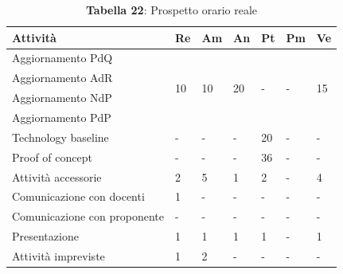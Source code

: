 \begin{table}[H]
	\centering
	\begin{tabular}{|l|l|l|l|l|l|l|}
		\hline
		\rowcolor{lighter-grayer}
		\textbf{Attività}            & \textbf{Re}         & \textbf{Am}         & \textbf{An}         & \textbf{Pt}        & \textbf{Pm}        & \textbf{Ve}         \\ \hline
		Aggiornamento PdQ            & \multirow{4}{*}{10} & \multirow{4}{*}{10} & \multirow{4}{*}{20} & \multirow{4}{*}{-} & \multirow{4}{*}{-} & \multirow{4}{*}{15} \\ \cline{1-1}
		Aggiornamento AdR            &                     &                     &                     &                    &                    &                     \\ \cline{1-1}
		Aggiornamento NdP            &                     &                     &                     &                    &                    &                     \\ \cline{1-1}
		Aggiornamento PdP            &                     &                     &                     &                    &                    &                     \\ \hline
		Technology baseline          & -                   & -                   & -                   & 20                 & -                  & -                   \\ \hline
		Proof of concept             & -                   & -                   & -                   & 36                 & -                  & -                   \\ \hline
		Attività accessorie          & 2                   & 5                   & 1                   & 2                  & -                  & 4                   \\ \hline
		Comunicazione con docenti    & 1                   & -                   & -                   & -                  & -                  & -                   \\ \hline
		Comunicazione con proponente & -                   & -                   & -                   & -                  & -                  & -                   \\ \hline
		Presentazione                & 1                   & 1                   & 1                   & 1                  & -                  & 1                   \\ \hline
		Attività impreviste          & 1                   & 2                   & -                   & -                  & -                  & -                   \\ \hline
	\end{tabular}
	\caption*{\textbf{Tabella 22}: Prospetto orario reale\\}
\end{table}

